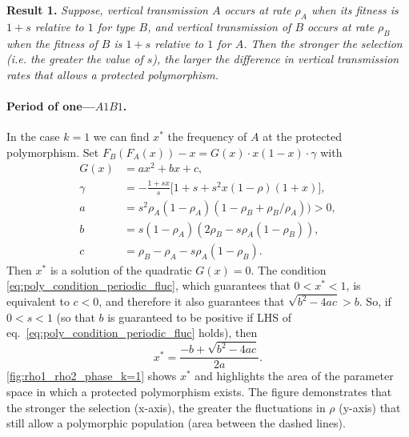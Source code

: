 \documentclass[14pt]{extarticle}
\begin{document}
{\bf Result 1.} {\sl Suppose, vertical transmission $A$ occurs at rate $\rho_A$ when its fitness is $1+s$ relative to $1$ for type $B$, and vertical transmission of $B$ occurs at rate $\rho_B$ when the fitness of $B$ is $1+s$ relative to $1$ for $A$. Then the stronger the selection (i.e. the greater the value of $s$), the larger the difference in vertical transmission rates that allows a protected polymorphism.}

\paragraph{Period of one---$A1B1$.}
In the case  $k=1$ we can find $x^*$ the frequency of $A$ at the protected polymorphism.
Set $F_B(F_A(x))-x = G(x) \cdot x (1-x) \cdot \gamma$ with
\begin{equation} \begin{aligned} \label{eq:xstar_periodic_fluc_k=1}
G(x) &= ax^2+bx+c, \\
\gamma &= -\frac{1 + sx}{s} \Big[ 1 + s + s^2 x (1-\rho)(1+x)\Big], \\
a &= s^2 \rho_A (1-\rho_A) (1 - \rho_B + \rho_B/\rho_A)) > 0, \\
b &= s(1-\rho_A)(2\rho_B - s\rho_A(1-\rho_B)), \\
c &= \rho_B - \rho_A - s\rho_A(1-\rho_B).
\end{aligned} \end{equation}
Then $x^*$ is a solution of the quadratic $G(x)=0$. %
The condition \eqref{eq:poly_condition_periodic_fluc}, which guarantees that $0 < x^* < 1$, is equivalent to $c<0$, and therefore it also guarantees that $\sqrt{b^2-4ac} > b$.
So, if $0<s<1$ (so that $b$ is guaranteed to be positive if LHS of eq.~\ref{eq:poly_condition_periodic_fluc} holds), then 
\begin{equation}
x^*= \frac{-b+\sqrt{b^2-4ac}}{2a}.
\end{equation}
\autoref{fig:rho1_rho2_phase_k=1} shows $x^*$ and highlights the area of the parameter space in which a protected polymorphism exists.
The figure demonstrates that the stronger the selection (x-axis), the greater the fluctuations in $\rho$  (y-axis) that still allow a polymorphic population (area between the dashed lines).

\end{document}
